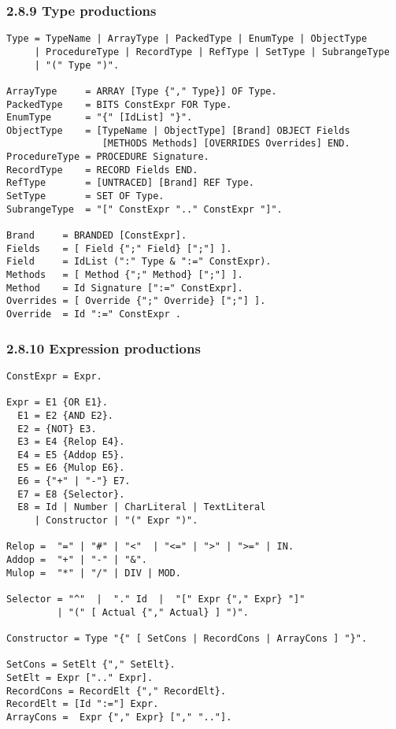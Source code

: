 \documentclass[10pt]{article}
\begin{document}
\subsubsection*{2.8.9 Type productions}

\begin{verbatim}
Type = TypeName | ArrayType | PackedType | EnumType | ObjectType
     | ProcedureType | RecordType | RefType | SetType | SubrangeType
     | "(" Type ")".

ArrayType     = ARRAY [Type {"," Type}] OF Type.
PackedType    = BITS ConstExpr FOR Type.
EnumType      = "{" [IdList] "}".
ObjectType    = [TypeName | ObjectType] [Brand] OBJECT Fields
                 [METHODS Methods] [OVERRIDES Overrides] END.
ProcedureType = PROCEDURE Signature.
RecordType    = RECORD Fields END.
RefType       = [UNTRACED] [Brand] REF Type.
SetType       = SET OF Type.
SubrangeType  = "[" ConstExpr ".." ConstExpr "]".

Brand     = BRANDED [ConstExpr].
Fields    = [ Field {";" Field} [";"] ].
Field     = IdList (":" Type & ":=" ConstExpr).
Methods   = [ Method {";" Method} [";"] ].
Method    = Id Signature [":=" ConstExpr].
Overrides = [ Override {";" Override} [";"] ].
Override  = Id ":=" ConstExpr .
\end{verbatim}

\subsubsection*{2.8.10 Expression productions}

\begin{verbatim}
ConstExpr = Expr.

Expr = E1 {OR E1}.
  E1 = E2 {AND E2}.
  E2 = {NOT} E3.
  E3 = E4 {Relop E4}.
  E4 = E5 {Addop E5}.
  E5 = E6 {Mulop E6}.
  E6 = {"+" | "-"} E7.
  E7 = E8 {Selector}.
  E8 = Id | Number | CharLiteral | TextLiteral
     | Constructor | "(" Expr ")".

Relop =  "=" | "#" | "<"  | "<=" | ">" | ">=" | IN.
Addop =  "+" | "-" | "&".
Mulop =  "*" | "/" | DIV | MOD.

Selector = "^"  |  "." Id  |  "[" Expr {"," Expr} "]"
         | "(" [ Actual {"," Actual} ] ")".

Constructor = Type "{" [ SetCons | RecordCons | ArrayCons ] "}".

SetCons = SetElt {"," SetElt}.
SetElt = Expr [".." Expr].
RecordCons = RecordElt {"," RecordElt}.
RecordElt = [Id ":="] Expr.
ArrayCons =  Expr {"," Expr} ["," ".."].
\end{verbatim}
\end{document}
